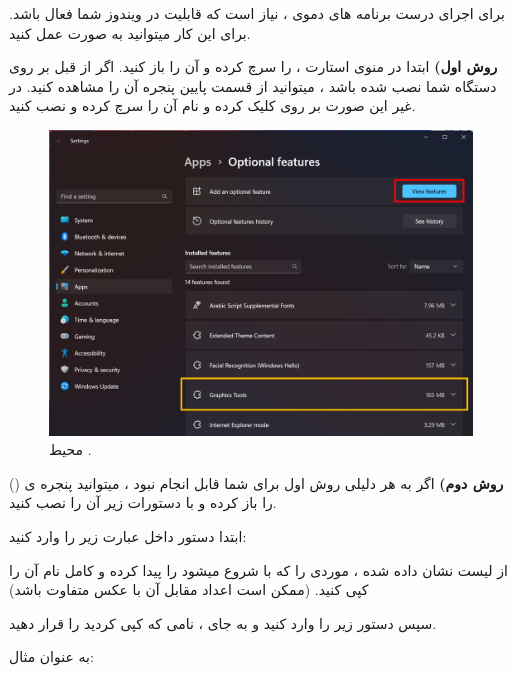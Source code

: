     {\large
    برای اجرای درست برنامه های دموی  ، نیاز است که قابلیت  در ویندوز شما فعال باشد.
    برای این کار میتوانید به صورت عمل کنید.

    \textbf{روش اول)}
    ابتدا در منوی استارت ،  را سرچ کرده و آن را باز کنید.
    اگر  از قبل بر روی دستگاه شما نصب شده باشد ، میتوانید از قسمت پایین پنجره آن را مشاهده کنید.
    در غیر این صورت بر روی  کلیک کرده و نام آن را سرچ کرده و نصب کنید.

    }
    \begin{figure}[H]
        \centering
        \setlength{\belowcaptionskip}{-10pt}
        \includegraphics[width=\textwidth]{Images/1.Intro.4.1.png}
        \caption{محیط .}
    \end{figure}

    {\large
    \textbf{روش دوم)}
    اگر به هر دلیلی روش اول برای شما قابل انجام نبود ، میتوانید پنجره ی  () را باز کرده و با دستورات زیر آن را نصب کنید.

    ابتدا دستور داخل  عبارت زیر را وارد کنید:

        \begin{flushleft}
        \end{flushleft}

        از لیست نشان داده شده ، موردی را که با  شروع میشود را پیدا کرده و کامل نام آن را کپی کنید. (ممکن است اعداد مقابل آن با عکس متفاوت باشد)

        سپس دستور زیر را وارد کنید و به جای  ، نامی که کپی کردید را قرار دهید.

        \begin{flushleft}
        \end{flushleft}

        به عنوان مثال:

        \begin{flushleft}
            \normalsize
        \end{flushleft}
    }

